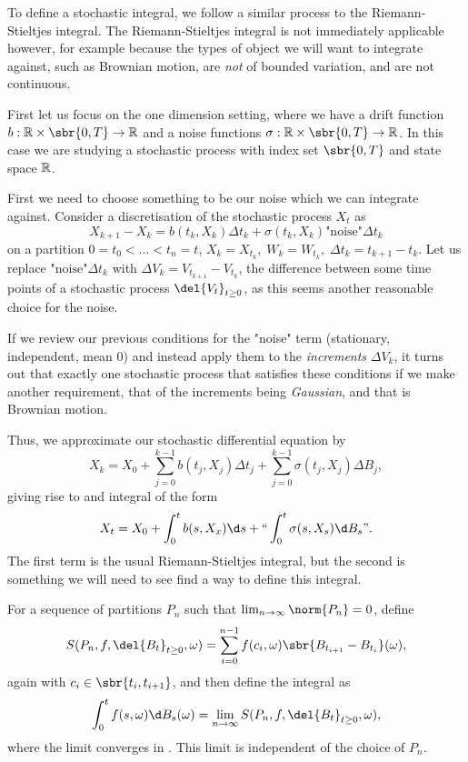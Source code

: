 To define a stochastic integral, we follow a similar process to the Riemann-Stieltjes integral.
The Riemann-Stieltjes integral is not immediately applicable however, for example because the types of object we will want to integrate against, such as Brownian motion, are \emph{not} of bounded variation, and are not continuous.

First let us focus on the one dimension setting, where we have a drift function \(b:\R\times\sbr{0,T} \to \R\) and a noise functions \(\sigma: \R \times \sbr{0,T} \to \R\).
In this case we are studying a stochastic process with index set \(\sbr{0,T}\) and state space \(\mathbb{R}\).

First we need to choose something to be our noise which we can integrate against.
Consider a discretisation of the stochastic process \(X_t\) as \[X_{{k+1}} - X_{k} = b(t_k, X_{k}) \Delta t_k + \sigma(t_k, X_{k}) \text{"noise"} \Delta t_k\] on a partition \(0=t_0 < .
.. < t_n = t\), \(X_k = X_{t_k}, \; W_k = W_{t_k}, \; \Delta t_k = t_{k+1} - t_k\).
Let us replace \(\text{"noise"} \Delta t_k\) with \(\Delta V_k = V_{t_{k+1}} - V_{t_k}\), the difference between some time points of a stochastic process \(\del{V_t}_{t \geq 0}\), as this seems another reasonable choice for the noise.

If we review our previous conditions for the "noise" term (stationary, independent, mean \(0\)) and instead apply them to the \emph{increments} \(\Delta V_{k}\), it turns out that exactly one stochastic process that satisfies these conditions if we make another requirement, that of the increments being \emph{Gaussian}, and that is Brownian motion.

Thus, we approximate our stochastic differential equation by \[X_k = X_0 + \sum_{j=0}^{k-1} b(t_j, X_{j}) \Delta t_j + \sum_{j=0}^{k-1} \sigma(t_j, X_{j}) \Delta B_j ,\] giving rise to and integral of the form \[X_t = X_0 + \int_0^t b(s, X_x) \d s + ``\int_0^t \sigma(s, X_s) \d B_s".\]
The first term is the usual Riemann-Stieltjes integral, but the second is something we will need to see find a way to define this integral.

For a sequence of partitions \(P_n\) such that \(\lim_{n\to \infty}\norm{P_n} = 0\), define \[S(P_n, f, \del{B_t}_{t \geq 0}, \omega) = \sum_{i=0}^{n-1} f(c_i, \omega)\sbr{B_{t_{i+1}} - B_{t_i}}(\omega),\] again with \(c_i\in \sbr{t_i, t_{i+1}}\), and then define the integral as \[\int_0^t f(s, \omega) \d B_s(\omega) = \lim_{n\to \infty} S(P_n, f, \del{B_t}_{t \geq 0}, \omega),\] where the limit converges in .
This limit is independent of the choice of \(P_n\).

